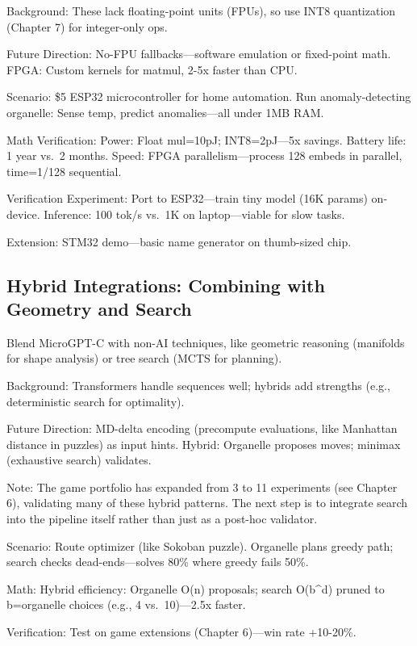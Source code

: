 \documentclass[
]{article}
\begin{document}
Background: These lack floating-point units (FPUs), so use INT8
quantization (Chapter 7) for integer-only ops.

Future Direction: No-FPU fallbacks---software emulation or fixed-point
math. FPGA: Custom kernels for matmul, 2-5x faster than CPU.

Scenario: \$5 ESP32 microcontroller for home automation. Run
anomaly-detecting organelle: Sense temp, predict anomalies---all under
1MB RAM.

Math Verification: Power: Float mul=10pJ; INT8=2pJ---5x savings. Battery
life: 1 year vs.~2 months. Speed: FPGA parallelism---process 128 embeds
in parallel, time=1/128 sequential.

Verification Experiment: Port to ESP32---train tiny model (16K params)
on-device. Inference: 100 tok/s vs.~1K on laptop---viable for slow
tasks.

Extension: STM32 demo---basic name generator on thumb-sized chip.

\subsection{Hybrid Integrations: Combining with Geometry and
Search}\label{hybrid-integrations-combining-with-geometry-and-search}

Blend MicroGPT-C with non-AI techniques, like geometric reasoning
(manifolds for shape analysis) or tree search (MCTS for planning).

Background: Transformers handle sequences well; hybrids add strengths
(e.g., deterministic search for optimality).

Future Direction: MD-delta encoding (precompute evaluations, like
Manhattan distance in puzzles) as input hints. Hybrid: Organelle
proposes moves; minimax (exhaustive search) validates.

Note: The game portfolio has expanded from 3 to 11 experiments (see
Chapter 6), validating many of these hybrid patterns. The next step is
to integrate search into the pipeline itself rather than just as a
post-hoc validator.

Scenario: Route optimizer (like Sokoban puzzle). Organelle plans greedy
path; search checks dead-ends---solves 80\% where greedy fails 50\%.

Math: Hybrid efficiency: Organelle O(n) proposals; search O(b\^{}d)
pruned to b=organelle choices (e.g., 4 vs.~10)---2.5x faster.

Verification: Test on game extensions (Chapter 6)---win rate +10-20\%.
\end{document}
